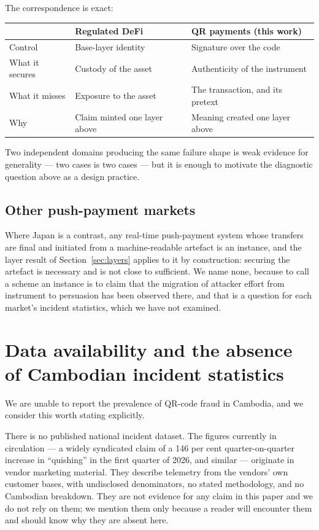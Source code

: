 \documentclass[10pt,a4paper,twocolumn]{article}
\makeatletter
\newcommand{\threecol}{@{}p{0.19\columnwidth}p{0.36\columnwidth}p{0.37\columnwidth}@{}}
\newcommand{\threecol}{@{}lll@{}}
\makeatother
\begin{document}
The correspondence is exact:

\begin{center}
\small
\begin{tabular}{\threecol}
\toprule
 & \textbf{Regulated DeFi} \citep{sengtha2026csb} & \textbf{QR payments (this work)} \\
\midrule
Control        & Base-layer identity   & Signature over the code \\
What it secures & Custody of the asset  & Authenticity of the instrument \\
What it misses  & Exposure to the asset & The transaction, and its pretext \\
Why             & Claim minted one layer above & Meaning created one layer above \\
\bottomrule
\end{tabular}
\end{center}

Two independent domains producing the same failure shape is weak evidence for
generality --- two cases is two cases --- but it is enough to motivate the
diagnostic question above as a design practice.

\subsection{Other push-payment markets}

Where Japan is a contrast, any real-time push-payment system whose transfers
are final and initiated from a machine-readable artefact is an instance, and
the layer result of Section~\ref{sec:layers} applies to it by construction:
securing the artefact is necessary and is not close to sufficient. We name
none, because to call a scheme an instance is to claim that the migration of
attacker effort from instrument to persuasion has been observed there, and that
is a question for each market's incident statistics, which we have not
examined.

\section{Data availability and the absence of Cambodian incident statistics}
\label{sec:data}

We are unable to report the prevalence of QR-code fraud in Cambodia, and we
consider this worth stating explicitly.

There is no published national incident dataset. The figures currently in
circulation --- a widely syndicated claim of a 146 per cent quarter-on-quarter
increase in ``quishing'' in the first quarter of 2026, and similar --- originate in
vendor marketing material. They describe telemetry from the vendors' own
customer bases, with undisclosed denominators, no stated methodology, and no
Cambodian breakdown. They are not evidence for any claim in this paper and we do
not rely on them; we mention them only because a reader will encounter them and
should know why they are absent here.
\end{document}
